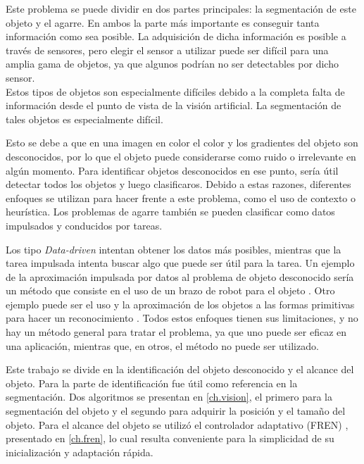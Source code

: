 Este problema se puede dividir en dos partes principales: la segmentación de este objeto y el agarre. En ambos la parte más importante es conseguir tanta información como sea posible. La adquisición de dicha información es posible a través de sensores, pero elegir el sensor a utilizar puede ser difícil para una amplia gama de objetos, ya que algunos podrían no ser detectables por dicho sensor. \\

Estos tipos de objetos son especialmente difíciles debido a la completa falta de información desde el punto de vista de la visión artificial. La segmentación de tales objetos es especialmente difícil.

Esto se debe a que en una imagen en color el color y los gradientes del objeto son desconocidos, por lo que el objeto puede considerarse como ruido o irrelevante en algún momento. Para identificar objetos desconocidos en ese punto, sería útil detectar todos los objetos y luego clasificaros. Debido a estas razones, diferentes enfoques se utilizan para hacer frente a este problema, como el uso de contexto o heurística. Los problemas de agarre también se pueden clasificar como datos impulsados ​​y conducidos por tareas.


Los tipo \textit{Data-driven} intentan obtener los datos más posibles, mientras que la tarea impulsada intenta buscar algo que puede ser útil para la tarea. Un ejemplo de la aproximación impulsada por datos al problema de objeto desconocido sería un método que consiste en el uso de un brazo de robot para el objeto \cite{kaneko1994contact}. Otro ejemplo puede ser el uso y la aproximación de los objetos a las formas primitivas para hacer un reconocimiento \cite{fornas2016fitting, felip2009robust, miller2003automatic, huebner2008selection}. Todos estos enfoques tienen sus limitaciones, y no hay un método general para tratar el problema, ya que uno puede ser eficaz en una aplicación, mientras que, en otros, el método no puede ser utilizado.

Este trabajo se divide en la identificación del objeto desconocido y el alcance del objeto. Para la parte de identificación \cite{hosang2016makes} fue útil como referencia en la segmentación. Dos algoritmos se presentan en \cref{ch.vision}, el primero para la segmentación del objeto y el segundo para adquirir la posición y el tamaño del objeto.
Para el alcance del objeto se utilizó el controlador adaptativo (FREN) \cite{fren}, presentado en \cref{ch.fren}, lo cual resulta conveniente para la simplicidad de su inicialización y adaptación rápida.

